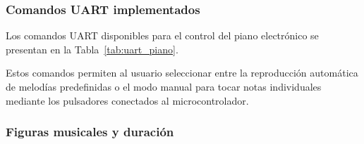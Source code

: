 \begin{table}[H]
\centering
{}
\caption{Asignación de pines utilizada en el piano electrónico.}
\label{tab:pines_piano}
\end{table}

\subsubsection{Comandos UART implementados}

Los comandos UART disponibles para el control del piano electrónico se presentan en la Tabla~\ref{tab:uart_piano}. 

\begin{table}[H]
\centering
{}
\caption{Comandos UART disponibles para el control del piano electrónico.}
\label{tab:uart_piano}
\end{table}

Estos comandos permiten al usuario seleccionar entre la reproducción automática de melodías predefinidas o el modo manual para tocar notas individuales mediante los pulsadores conectados al microcontrolador.

\vspace{0.5cm}

\subsubsection{Figuras musicales y duración}

